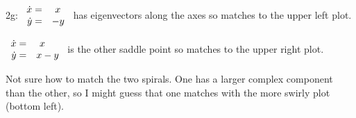 \documentclass[12pt,letterpaper,noanswers]{exam}
\begin{document}
\begin{questions}
2g: 
$\begin{array}{r l c} \dot{x} = &\ x  \\ \dot{y} = &- y\end{array} $ has eigenvectors along the axes so matches to the upper left plot.

$\begin{array}{r l c} \dot{x} = &\ x  \\ \dot{y} = &x- y\end{array} $ is the other saddle point so matches to the upper right plot.

Not sure how to match the two spirals.  One has a larger complex component than the other, so I might guess that one matches with the more swirly plot (bottom left).






\end{questions}
\end{document}
